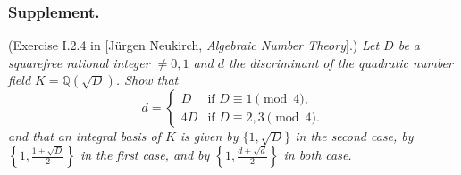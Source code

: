 \documentclass{article}
\begin{document}
\subsubsection*{Supplement.}
(Exercise I.2.4 in [J\"urgen Neukirch, \emph{Algebraic Number Theory}].)
\emph{Let $D$ be a squarefree rational integer $\neq 0, 1$ and
$d$ the discriminant of the quadratic number field $K = \mathbb{Q}(\sqrt{D})$.
Show that
\begin{equation*}
  d = \begin{cases}
    D  & \text{if $D \equiv 1 \pmod 4$,}\\
    4D & \text{if $D \equiv 2, 3 \pmod 4$.}
  \end{cases}
\end{equation*}
and that an integral basis of $K$ is given by $\{1, \sqrt{D}\}$ in the second case,
by $\left\{ 1, \frac{1+\sqrt{D}}{2} \right\}$ in the first case,
and by $\left\{ 1, \frac{d+\sqrt{d}}{2} \right\}$ in both case.} \\
\end{document}
